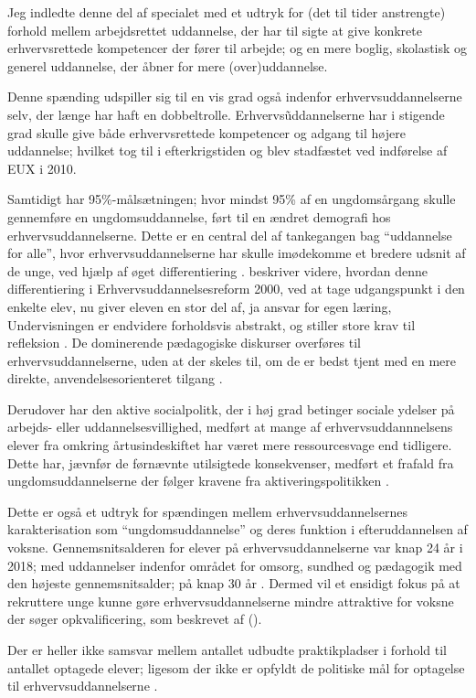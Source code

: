 Jeg indledte denne del af specialet med et udtryk for (det til tider anstrengte) forhold mellem arbejdsrettet uddannelse, der har til sigte at give konkrete erhvervsrettede kompetencer der fører til arbejde; og en mere boglig, skolastisk og generel uddannelse, der åbner for mere (over)uddannelse.

Denne spænding udspiller sig til en vis grad også indenfor erhvervsuddannelserne selv, der længe har haft en dobbeltrolle.
Erhvervs\~uddannelserne har i stigende grad skulle give både erhvervsrettede kompetencer og adgang til højere uddannelse; hvilket tog til i efterkrigstiden \autocite[s. 47ff]{bondergaardHistoricalEmergenceKey2014} og blev stadfæstet ved indførelse af EUX i 2010.


Samtidigt har 95\%-målsætningen; hvor mindst 95\% af en ungdomsårgang skulle gennemføre en ungdomsuddannelse, ført til en ændret demografi hos erhvervsuddannelserne.
Dette er en central del af tankegangen bag “uddannelse for alle”, hvor erhvervsuddannelserne har skulle imødekomme et bredere udsnit af de unge, ved hjælp af øget differentiering \autocite[s. 365f]{aarkrogRummelighedOgSammenhaeng2003}.
\citeauthor{aarkrogRummelighedOgSammenhaeng2003} beskriver videre, hvordan denne differentiering i Erhvervsuddannelsesreform 2000, ved at tage udgangspunkt i den enkelte elev, nu giver eleven en  stor del af, ja ansvar for egen læring, Undervisningen er endvidere forholdsvis abstrakt, og stiller store krav til refleksion \citeyear[s. 367f]{aarkrogRummelighedOgSammenhaeng2003}.
De dominerende pædagogiske diskurser overføres til erhvervsuddannelserne, uden at der skeles til, om de er bedst tjent med en mere direkte, anvendelsesorienteret tilgang \autocite[s.
]{aarkrogRummelighedOgSammenhaeng2003}.

Derudover har den aktive socialpolitk, der i høj grad betinger sociale ydelser på arbejds- eller uddannelsesvillighed, medført at mange af erhvervsuddannnelsens elever fra omkring årtusindeskiftet har været mere ressourcesvage end tidligere.
Dette har, jævnfør de førnævnte utilsigtede konsekvenser, medført et frafald fra ungdomsuddannelserne der følger kravene fra aktiveringspolitikken \autocite[s.13]{jorgensenReformenAfErhvervsuddannelserne2016}.

Dette er også et udtryk for spændingen mellem erhvervsuddannelsernes karakterisation som “ungdomsuddannelse” og deres funktion i efteruddannelsen af voksne.
Gennemsnitsalderen for elever på erhvervsuddannelserne var knap 24 år i 2018; med uddannelser indenfor området for omsorg, sundhed og pædagogik med den højeste gennemsnitsalder; på knap 30 år \autocite[s. 14]{danmarksstatistikErhvervsuddannelserDanmark20192019}.
Dermed vil et ensidigt fokus på at rekruttere unge kunne gøre erhvervsuddannelserne mindre attraktive for voksne der søger opkvalificering, som beskrevet af \citeauthor{jorgensenReformenAfErhvervsuddannelserne2016} (\citeyear[s. 13]{jorgensenReformenAfErhvervsuddannelserne2016}).

Der er heller ikke samsvar mellem antallet udbudte praktikpladser i forhold til antallet optagede elever; ligesom der ikke er opfyldt de politiske mål for optagelse til erhvervsuddannelserne \autocite[s. 10]{danmarksstatistikErhvervsuddannelserDanmark20192019}.


